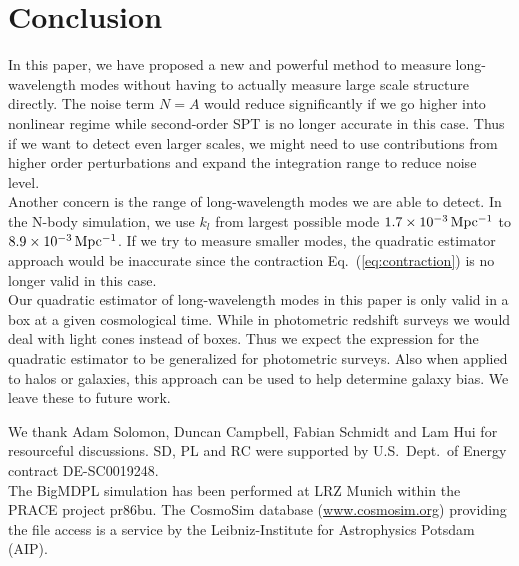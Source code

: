 \documentclass[prd,amsmath,amssymb,floatfix,superscriptaddress,nofootinbib,twocolumn]{revtex4-1}
\newcommand{\ec}[1]{Eq.~(\ref{eq:#1})}
\begin{document}
\section{Conclusion}\label{sec4}
In this paper, we have proposed a new and powerful method to measure long-wavelength modes without having to actually measure large scale structure directly. The noise term $N=A$ would reduce significantly if we go higher into nonlinear regime while second-order SPT is no longer accurate in this case. Thus if we want to detect even larger scales, we might need to use contributions from higher order perturbations and expand the integration range to reduce noise level. \\
Another concern is the range of long-wavelength modes we are able to detect. In the N-body simulation, we use $k_l$ from largest possible mode $1.7 \times 10^{-3} \, \rm Mpc^{-1}$ to $8.9\times 10^{-3} \, \rm Mpc^{-1}$. If we try to measure smaller modes, the quadratic estimator approach would be inaccurate since the contraction \ec{contraction} is no longer valid in this case.\\
Our quadratic estimator of long-wavelength modes in this paper is only valid in a box at a given cosmological time. While in photometric redshift surveys we would deal with light cones instead of boxes. Thus we expect the expression for the quadratic estimator to be generalized for photometric surveys. Also when applied to halos or galaxies, this approach can be used to help determine galaxy bias. We leave these to future work.

\acknowledgements
\noindent We thank Adam Solomon, Duncan Campbell, Fabian Schmidt and Lam Hui for resourceful discussions.  SD, PL and RC were supported by U.S.\ Dept.\ of Energy contract DE-SC0019248.\\
The BigMDPL simulation has been performed at LRZ Munich within the PRACE project pr86bu. The CosmoSim database (\url{www.cosmosim.org}) providing the file access is a service by the Leibniz-Institute for Astrophysics Potsdam (AIP).
%

\end{document}
